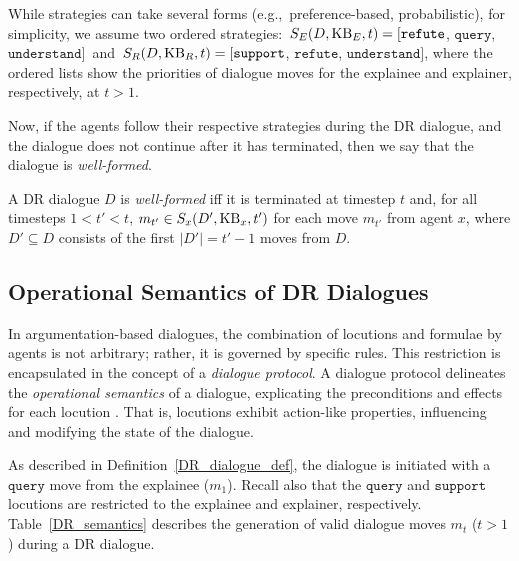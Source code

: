 \documentclass{article}
\begin{document}
While strategies can take several forms (e.g.,~preference-based, probabilistic), for simplicity, we assume two ordered strategies:~$S_E(D, \mathrm{KB}_E, t) = [\texttt{refute}$, $\texttt{query}$, $\texttt{understand}]$~and~$S_R(D, \mathrm{KB}_R, t) = [\texttt{support}$, $\texttt{refute}$, $\texttt{understand}]$, where the ordered lists show the priorities of dialogue moves for the explainee and explainer, respectively, at $t > 1$.



Now, if the agents follow their respective strategies during the DR dialogue, and the dialogue does not continue after it has terminated, then we say that the dialogue is \emph{well-formed}.

\begin{definition}
A DR dialogue $D$ is \emph{well-formed} iff it is terminated at timestep $t$ and, for all timesteps $1<t'<t$, $m_{t'}\in S_x(D', \mathrm{KB}_x, t')$ for each move $m_{t'}$ from agent $x$, where $D' \subseteq D$ consists of the first $|D'| = t' - 1$ moves from $D$.
\end{definition}











\subsection{Operational Semantics of DR Dialogues}
\label{semantics}

In argumentation-based dialogues, the combination of locutions and formulae by agents is not arbitrary; rather, it is governed by specific rules. This restriction is encapsulated in the concept of a \emph{dialogue protocol}. A dialogue protocol delineates the \emph{operational semantics} of a dialogue, explicating the preconditions and effects for each locution \citep{plotkin1981structural}. That is, locutions exhibit action-like properties, influencing and modifying the state of the dialogue.




 
As described in Definition~\ref{DR_dialogue_def}, the dialogue is initiated with a $\texttt{query}$ move from the explainee ($m_1$). Recall also that the $\texttt{query}$ and $\texttt{support}$ locutions are restricted to the explainee and explainer, respectively. Table~\ref{DR_semantics} describes the generation of valid dialogue moves $m_t$ ($t>1$) during a DR dialogue. 
\end{document}
